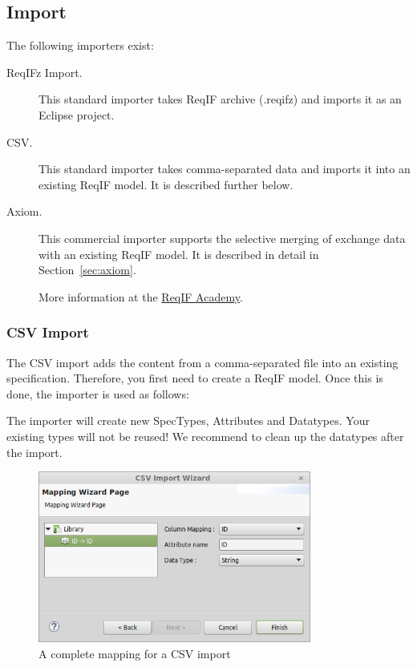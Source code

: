 \subsection{Import}

The following importers exist:

\begin{description}
\item[ReqIFz Import.] This standard importer takes ReqIF archive (.reqifz) and imports it as an Eclipse project.

\item[CSV.] This standard importer takes comma-separated data and imports it into an existing ReqIF model.  It is described further below.

\item[Axiom.] This commercial importer supports the selective merging of exchange data with an existing ReqIF model.  It is described in detail in Section~\ref{sec:axiom}.

More information at the \href{https://reqif.academy}{ReqIF Academy}.

\end{description}

\subsubsection{CSV Import}

The CSV import adds the content from a comma-separated file into an existing specification.  Therefore, you first need to create a ReqIF model.  Once this is done, the importer is used as follows:

\begin{warning}
The importer will create new SpecTypes, Attributes and Datatypes.  Your existing types will not be reused!  We recommend to clean up the datatypes after the import.
\end{warning}

\begin{figure}
  \centering
  \includegraphics[width=0.8\textwidth]{../rmf-images/CSV_import.png}
  \caption{A complete mapping for a CSV import}
  \label{fig:csv}
\end{figure}

